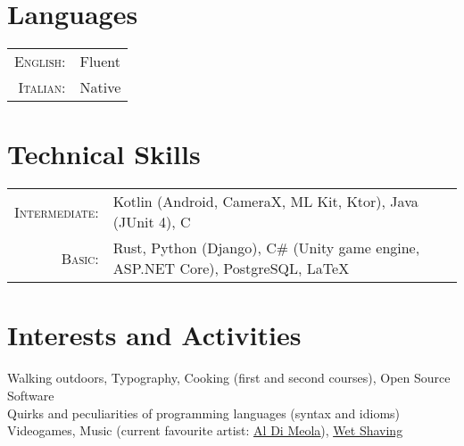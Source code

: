 \documentclass[a4paper,10pt]{article} %
\begin{document}

\section{Languages}

\begin{tabular}{rl}
\textsc{English:} & Fluent\\
\textsc{Italian:} & Native\\
\end{tabular}


\section{Technical Skills}

\begin{tabular}{rl}
\textsc{Intermediate:} & Kotlin \footnotesize(Android, CameraX, ML Kit, Ktor)\normalsize, Java \footnotesize(JUnit 4)\normalsize, C\\
\textsc{Basic:} & Rust, Python \footnotesize(Django)\normalsize, C\# \footnotesize(Unity game engine, ASP.NET Core)\normalsize, PostgreSQL, {\sffamily\LaTeX}\setmainfont[SmallCapsFont=Fontin SmallCaps]{Fontin-Regular}\\

\end{tabular}


\section{Interests and Activities}

Walking outdoors, Typography, Cooking \footnotesize(first and second courses)\normalsize, Open Source Software\\
Quirks and peculiarities of programming languages \footnotesize(syntax and idioms)\normalsize\\
Videogames, Music \footnotesize(current favourite artist: \href{https://youtu.be/tsmThCBkBUo}{\underline{Al Di Meola}})\normalsize, \href{https://youtu.be/NRf48k8f-Yc}{\underline{Wet Shaving}}

\end{document}
